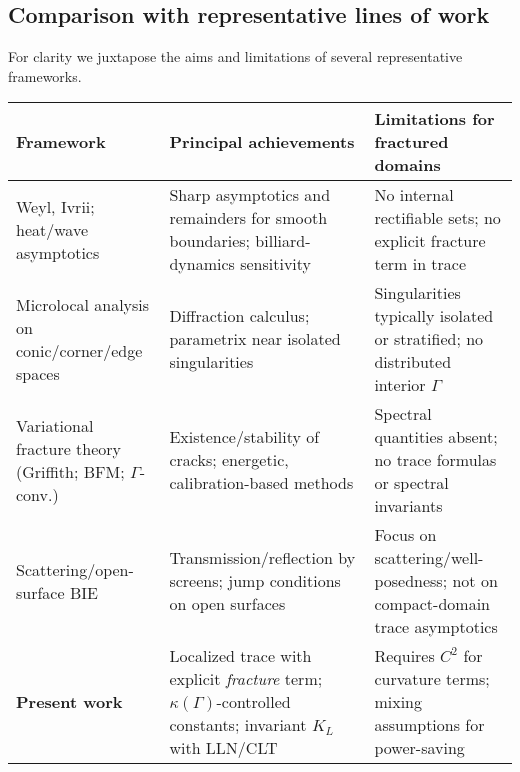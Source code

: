 \subsection*{Comparison with representative lines of work}
For clarity we juxtapose the aims and limitations of several representative frameworks.
\begin{center}
\renewcommand{\arraystretch}{1.15}
\begin{tabular}{|p{3.6cm}|p{6.1cm}|p{5.3cm}|}
\hline
\textbf{Framework} & \textbf{Principal achievements} & \textbf{Limitations for fractured domains} \\
\hline
Weyl, Ivrii; heat/wave asymptotics & Sharp asymptotics and remainders for smooth boundaries; billiard-dynamics sensitivity & No internal rectifiable sets; no explicit fracture term in trace \\
\hline
Microlocal analysis on conic/corner/edge spaces & Diffraction calculus; parametrix near isolated singularities & Singularities typically isolated or stratified; no distributed interior $\Gamma$ \\
\hline
Variational fracture theory (Griffith; BFM; $\Gamma$-conv.) & Existence/stability of cracks; energetic, calibration-based methods & Spectral quantities absent; no trace formulas or spectral invariants \\
\hline
Scattering/open-surface BIE & Transmission/reflection by screens; jump conditions on open surfaces & Focus on scattering/well-posedness; not on compact-domain trace asymptotics \\
\hline
\textbf{Present work} & Localized trace with explicit \emph{fracture} term; $\kappa(\Gamma)$-controlled constants; invariant $K_L$ with LLN/CLT & Requires $C^2$ for curvature terms; mixing assumptions for power-saving \\
\hline
\end{tabular}
\end{center}

